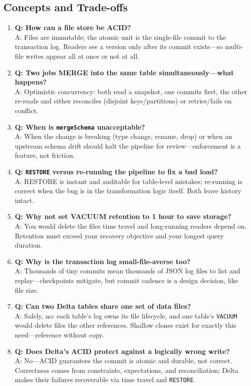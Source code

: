 \subsection{Concepts and Trade-offs}
\begin{enumerate}
    \item \textbf{Q: How can a file store be ACID?}\\
    A: Files are immutable; the atomic unit is the single-file commit to the transaction log. Readers see a version only after its commit exists---so multi-file writes appear all at once or not at all.
    \item \textbf{Q: Two jobs MERGE into the same table simultaneously---what happens?}\\
    A: Optimistic concurrency: both read a snapshot, one commits first, the other re-reads and either reconciles (disjoint keys/partitions) or retries/fails on conflict.
    \item \textbf{Q: When is \texttt{mergeSchema} unacceptable?}\\
    A: When the change is breaking (type change, rename, drop) or when an upstream schema drift should halt the pipeline for review---enforcement is a feature, not friction.
    \item \textbf{Q: \texttt{RESTORE} versus re-running the pipeline to fix a bad load?}\\
    A: RESTORE is instant and auditable for table-level mistakes; re-running is correct when the bug is in the transformation logic itself. Both leave history intact.
    \item \textbf{Q: Why not set VACUUM retention to 1 hour to save storage?}\\
    A: You would delete the files time travel and long-running readers depend on. Retention must exceed your recovery objective and your longest query duration.
    \item \textbf{Q: Why is the transaction log small-file-averse too?}\\
    A: Thousands of tiny commits mean thousands of JSON log files to list and replay---checkpoints mitigate, but commit cadence is a design decision, like file size.
    \item \textbf{Q: Can two Delta tables share one set of data files?}\\
    A: Safely, no: each table's log owns its file lifecycle, and one table's \texttt{VACUUM} would delete files the other references. Shallow clones exist for exactly this need---reference without copy.
    \item \textbf{Q: Does Delta's ACID protect against a logically wrong write?}\\
    A: No---ACID guarantees the commit is atomic and durable, not correct. Correctness comes from constraints, expectations, and reconciliation; Delta makes their failures recoverable via time travel and \texttt{RESTORE}.
\end{enumerate}

